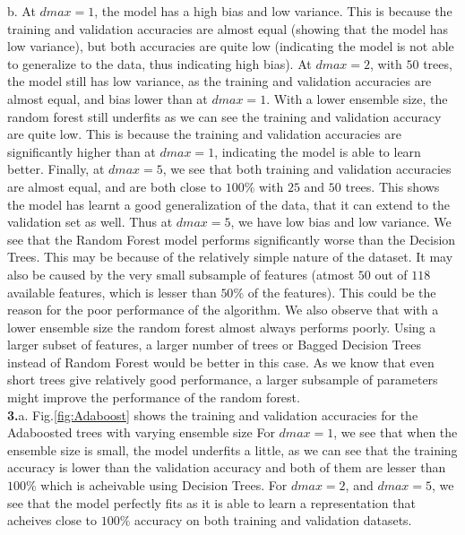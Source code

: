 \documentclass{article}
\begin{document}
b. At $dmax=1$, the model has a high bias and low variance. This is because the training and validation accuracies are almost equal (showing that the model has low variance), but both accuracies are quite low (indicating the model is not able to generalize to the data, thus indicating high bias). At $dmax=2$, with $50$ trees, the model still has low variance, as the training and validation accuracies are almost equal, and bias lower than at $dmax=1$. With a lower ensemble size, the random forest still underfits as we can see the training and validation accuracy are quite low. This is because the training and validation accuracies are significantly higher than at $dmax=1$, indicating the model is able to learn better. Finally, at $dmax=5$, we see that both training and validation accuracies are almost equal, and are both close to $100\%$ with $25$ and $50$ trees. This shows the model has learnt a good generalization of the data, that it can extend to the validation set as well. Thus at $dmax=5$, we have low bias and low variance. We see that the Random Forest model performs significantly worse than the Decision Trees. This may be because of the relatively simple nature of the dataset. It may also be caused by the very small subsample of features (atmost $50$ out of $118$ available features, which is lesser than $50\%$ of the features). This could be the reason for the poor performance of the algorithm. We also observe that with a lower ensemble size the random forest almost always performs poorly. Using a larger subset of features, a larger number of trees or Bagged Decision Trees instead of Random Forest would be better in this case. As we know that even short trees give relatively good performance, a larger subsample of parameters might improve the performance of the random forest.\\

\textbf{3.}a. Fig.\ref{fig:Adaboost} shows the training and validation accuracies for the Adaboosted trees with varying ensemble size For $dmax=1$, we see that when the ensemble size is small, the model underfits a little, as we can see that the training accuracy is lower than the validation accuracy and both of them are lesser than $100\%$ which is acheivable using Decision Trees. For $dmax=2$, and $dmax=5$, we see that the model perfectly fits as it is able to learn a representation that acheives close to $100\%$ accuracy on both training and validation datasets.\\
\end{document}
